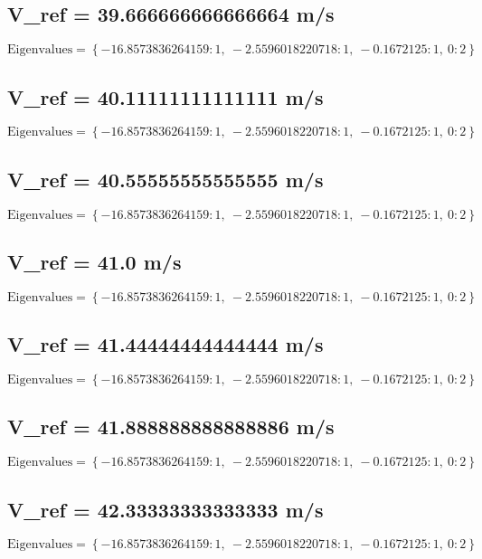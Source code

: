 \documentclass{article}
\begin{document}
\subsection*{V_ref = 39.666666666666664 m/s}
\begin{equation}
\text{Eigenvalues} = \left\{ -16.8573836264159 : 1, \  -2.5596018220718 : 1, \  -0.1672125 : 1, \  0 : 2\right\}
\end{equation}
\subsection*{V_ref = 40.11111111111111 m/s}
\begin{equation}
\text{Eigenvalues} = \left\{ -16.8573836264159 : 1, \  -2.5596018220718 : 1, \  -0.1672125 : 1, \  0 : 2\right\}
\end{equation}
\subsection*{V_ref = 40.55555555555555 m/s}
\begin{equation}
\text{Eigenvalues} = \left\{ -16.8573836264159 : 1, \  -2.5596018220718 : 1, \  -0.1672125 : 1, \  0 : 2\right\}
\end{equation}
\subsection*{V_ref = 41.0 m/s}
\begin{equation}
\text{Eigenvalues} = \left\{ -16.8573836264159 : 1, \  -2.5596018220718 : 1, \  -0.1672125 : 1, \  0 : 2\right\}
\end{equation}
\subsection*{V_ref = 41.44444444444444 m/s}
\begin{equation}
\text{Eigenvalues} = \left\{ -16.8573836264159 : 1, \  -2.5596018220718 : 1, \  -0.1672125 : 1, \  0 : 2\right\}
\end{equation}
\subsection*{V_ref = 41.888888888888886 m/s}
\begin{equation}
\text{Eigenvalues} = \left\{ -16.8573836264159 : 1, \  -2.5596018220718 : 1, \  -0.1672125 : 1, \  0 : 2\right\}
\end{equation}
\subsection*{V_ref = 42.33333333333333 m/s}
\begin{equation}
\text{Eigenvalues} = \left\{ -16.8573836264159 : 1, \  -2.5596018220718 : 1, \  -0.1672125 : 1, \  0 : 2\right\}
\end{equation}
\end{document}

